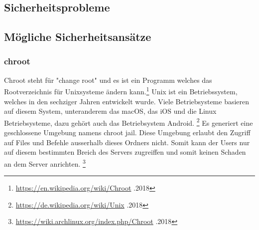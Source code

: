 \documentclass[10pt]{article}
\begin{document}
	\subsection{Sicherheitsprobleme}
	\subsection{Mögliche Sicherheitsansätze}
	\subsubsection{chroot}
	
	Chroot steht für "change root" und es ist ein Programm welches das Rootverzeichnis für Unixsysteme ändern kann.\footnote{\label{foot:1} \href{https://en.wikipedia.org/wiki/Chroot}{https://en.wikipedia.org/wiki/Chroot} .2018} Unix ist ein Betriebssystem, welches in den sechziger Jahren entwickelt wurde. Viele Betriebsysteme basieren auf diesem System, unteranderem das macOS, das iOS und die Linux Betriebsysteme, dazu gehört auch das Betriebsystem Android. \footnote{\label{foot:2} \href{https://de.wikipedia.org/wiki/Unix}{https://de.wikipedia.org/wiki/Unix} .2018}  Es generiert eine geschlossene Umgebung namens chroot jail. Diese Umgebung erlaubt den Zugriff auf  Files und Befehle ausserhalb dieses Ordners nicht. Somit kann der Users nur auf diesem bestimmten Breich des Servers zugreiffen und somit keinen Schaden an dem Server anrichten. \footnote{\label{foot:3} \href{https://wiki.archlinux.org/index.php/Chroot}{https://wiki.archlinux.org/index.php/Chroot} .2018}
		

	
	
\end{document}
